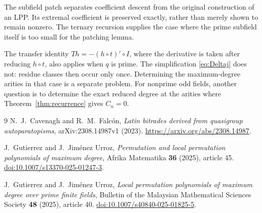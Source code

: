 \documentclass[11pt]{article}
\theoremstyle{remark}\newtheorem{remark}[theorem]{Remark}
\begin{document}
The subfield patch separates coefficient descent from the original
construction of an LPP. Its extremal coefficient is preserved exactly, rather
than merely shown to remain nonzero. The ternary recursion supplies the case
where the prime subfield itself is too small for the patching lemma.

The transfer identity $Th=-(h\circ t)'\circ I$, where the derivative is taken
after reducing $h\circ t$, also applies when $q$ is prime. The simplification
\eqref{eq:Deltaj} does not: residue classes then occur only once. Determining
the maximum-degree arities in that case is a separate problem. For nonprime
odd fields, another question is to determine the exact reduced degree at
the arities where Theorem~\ref{thm:recurrence} gives $C_n=0$.

\begin{thebibliography}{9}
N.~J.~Cavenagh and R.~M.~Falc\'on,
\emph{Latin bitrades derived from quasigroup autoparatopisms},
arXiv:2308.14987v1 (2023).
\url{https://arxiv.org/abs/2308.14987}.

J.~Gutierrez and J.~Jim\'enez Urroz,
\emph{Permutation and local permutation polynomials of maximum degree},
Afrika Matematika \textbf{36} (2025), article 45.
\href{https://doi.org/10.1007/s13370-025-01247-3}{doi:10.1007/s13370-025-01247-3}.

J.~Gutierrez and J.~Jim\'enez Urroz,
\emph{Local permutation polynomials of maximum degree over prime finite fields},
Bulletin of the Malaysian Mathematical Sciences Society \textbf{48} (2025),
article 40.
\href{https://doi.org/10.1007/s40840-025-01825-5}{doi:10.1007/s40840-025-01825-5}.
\end{thebibliography}
\end{document}

